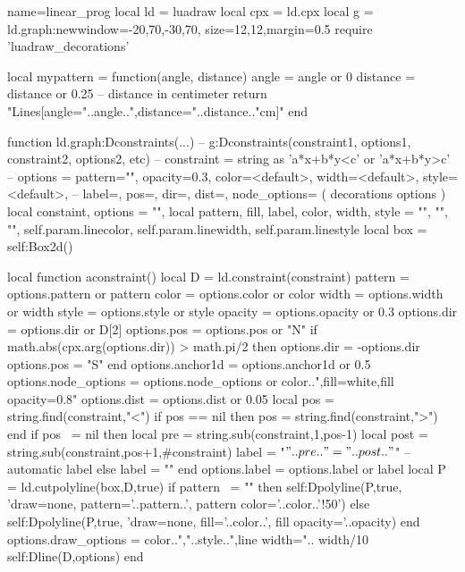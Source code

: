 \documentclass[]{standalone}
\begin{document}
\begin{luadraw}{name=linear_prog}
local ld = luadraw
local cpx = ld.cpx
local g = ld.graph:new{window={-20,70,-30,70}, size={12,12},margin=0.5}
require 'luadraw_decorations'

local mypattern = function(angle, distance)
    angle = angle or 0
    distance = distance or 0.25 -- distance in centimeter
    return "{Lines[angle="..angle..",distance="..distance.."cm]}"
end

function ld.graph:Dconstraints(...)
-- g:Dconstraints(constraint1, options1, constraint2, options2, etc)
-- constraint = string as 'a*x+b*y<c' or 'a*x+b*y>c'
-- options = {pattern="", opacity=0.3, color=<default>, width=<default>, style=<default>,
--      label=, pos=, dir=, dist=, node_options= } ( decorations options )
    local constaint, options = "", {}
    local pattern, fill, label, color, width, style = "", "", "", self.param.linecolor, self.param.linewidth, self.param.linestyle 
    local box = self:Box2d()
    
    local function aconstraint()
        local D = ld.constraint(constraint)
        pattern = options.pattern or pattern
        color = options.color or color
        width = options.width or width
        style = options.style or style
        opacity = options.opacity or 0.3
        options.dir = options.dir or D[2]
        options.pos = options.pos or "N"
        if math.abs(cpx.arg(options.dir)) > math.pi/2 then 
            options.dir = -options.dir
            options.pos = "S" 
        end
        options.anchor1d = options.anchor1d or 0.5
        options.node_options = options.node_options or color..",fill=white,fill opacity=0.8"
        options.dist = options.dist or 0.05
        local pos = string.find(constraint,"<")
        if pos == nil then 
            pos = string.find(constraint,">")
        end
        if pos ~= nil then
            local pre = string.sub(constraint,1,pos-1)
            local post = string.sub(constraint,pos+1,#constraint)
            label = "$"..pre.."="..post.."$"  -- automatic label
        else label = ""
        end
        options.label = options.label or label
        local P = ld.cutpolyline(box,D,true)
        if pattern ~= "" then
            self:Dpolyline(P,true, 'draw=none, pattern='..pattern..', pattern color='..color..'!50')
        else
            self:Dpolyline(P,true, 'draw=none, fill='..color..', fill opacity='..opacity)
        end
        options.draw_options = color..","..style..",line width=".. width/10
        self:Dline(D,options)
    end


\end{luadraw}
\end{document}
